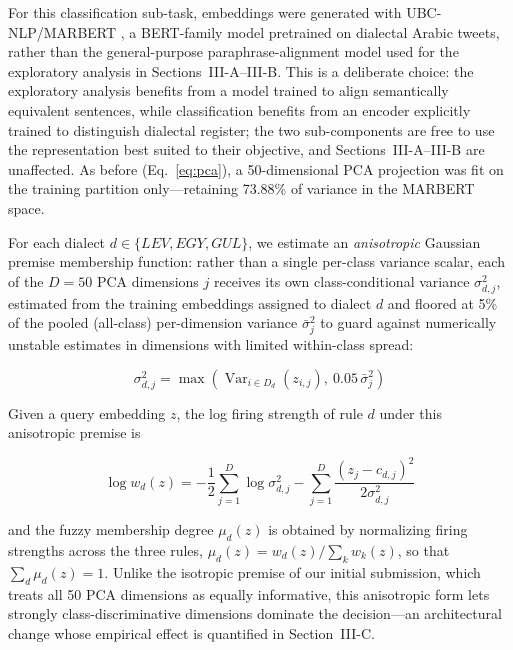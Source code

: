 \documentclass[conference]{IEEEtran}
\begin{document}
For this classification sub-task, embeddings were generated with UBC-NLP/MARBERT \cite{abdulmageed2021}, a BERT-family model pretrained on dialectal Arabic tweets, rather than the general-purpose paraphrase-alignment model used for the exploratory analysis in Sections~III-A--III-B. This is a deliberate choice: the exploratory analysis benefits from a model trained to align semantically equivalent sentences, while classification benefits from an encoder explicitly trained to distinguish dialectal register; the two sub-components are free to use the representation best suited to their objective, and Sections~III-A--III-B are unaffected. As before (Eq.~\ref{eq:pca}), a 50-dimensional PCA projection was fit on the training partition only---retaining 73.88\% of variance in the MARBERT space.

For each dialect $d \in \{LEV, EGY, GUL\}$, we estimate an \emph{anisotropic} Gaussian premise membership function: rather than a single per-class variance scalar, each of the $D=50$ PCA dimensions $j$ receives its own class-conditional variance $\sigma_{d,j}^2$, estimated from the training embeddings assigned to dialect $d$ and floored at 5\% of the pooled (all-class) per-dimension variance $\bar\sigma_j^2$ to guard against numerically unstable estimates in dimensions with limited within-class spread:

\begin{equation}
\sigma_{d,j}^2 = \max\!\left(\operatorname{Var}_{i \in D_d}(z_{i,j}),\ 0.05\,\bar\sigma_j^2\right)
\label{eq:variance}
\end{equation}

Given a query embedding $z$, the log firing strength of rule $d$ under this anisotropic premise is

\begin{equation}
\log w_d(z) = -\frac{1}{2}\sum_{j=1}^{D} \log \sigma_{d,j}^2 - \sum_{j=1}^{D} \frac{(z_j - c_{d,j})^2}{2\sigma_{d,j}^2}
\label{eq:firing}
\end{equation}

and the fuzzy membership degree $\mu_d(z)$ is obtained by normalizing firing strengths across the three rules, $\mu_d(z) = w_d(z) / \sum_{k} w_k(z)$, so that $\sum_d \mu_d(z) = 1$. Unlike the isotropic premise of our initial submission, which treats all 50 PCA dimensions as equally informative, this anisotropic form lets strongly class-discriminative dimensions dominate the decision---an architectural change whose empirical effect is quantified in Section~III-C.
\end{document}

